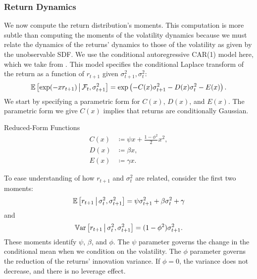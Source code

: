 \documentclass[11pt, letterpaper, twoside]{article}
\begin{document}
\subsubsection{Return Dynamics}

We now compute the return distribution's moments. This computation is more subtle than computing the moments of the volatility dynamics because we must relate the dynamics of the returns' dynamics to those of the volatility as given by the unobservable SDF. We use the conditional autoregressive CAR(1) model here, which we take from \textcite{darolles2006structural,han2018leverage}. This model specifies the conditional Laplace transform of the return as a function of $r_{t+1}$ given $\sigma^2_{t+1}, \sigma^2_t$: 
%
\begin{equation}
    \operatorname{\mathbb{E}}\left[\exp(- x r_{t+1}) \,\middle\vert\, \mathcal{F}_{t}, \sigma^2_{t+1} \right] = \exp\left(- C(x) \sigma^2_{t+1} - D(x) \sigma^2_t - E(x)\right).
\end{equation}
%
We start by specifying a parametric form for $C(x)$, $D(x)$, and $E(x)$. The parametric form we give  $C(x)$ implies that returns are conditionally Gaussian.

\begin{defn}{Reduced-Form Functions}
    \label{defn:physical_return_dynamics}
    \begin{align}
        C(x) &\coloneqq \psi x + \frac{1 - \phi^2}{2} x^2, \\
        D(x) &\coloneqq \beta x, \\
        E(x) &\coloneqq \gamma x. 
    \end{align}
\end{defn}



To ease understanding of how $r_{t+1}$ and $\sigma^2_t$ are related, consider the first two moments:
%
\begin{equation}
    \label{eqn:rtn_cond_mean}
    \operatorname{\mathbb{E}}\left[r_{t+1} \,\middle\vert\, \sigma^2_t, \sigma^2_{t+1}\right] = \psi \sigma^2_{t+1} + \beta \sigma^2_t + \gamma \\
\end{equation}
%
and
%
\begin{equation}
    \label{eqn:rtn_cond_vol}
    \operatorname{\mathbb{V}ar}\left[r_{t+1} \,\middle\vert\, \sigma^2_t, \sigma^2_{t+1}\right] = (1 - \phi^2) \sigma^2_{t+1}.
\end{equation}
%
These moments identify $\psi$, $\beta$, and $\phi$. The $\psi$ parameter governs the change in the conditional mean when we condition on the volatility. The $\phi$ parameter governs the reduction of the returns' innovation variance. If $\phi=0$, the variance does not decrease, and there is no leverage effect.  
\end{document}
